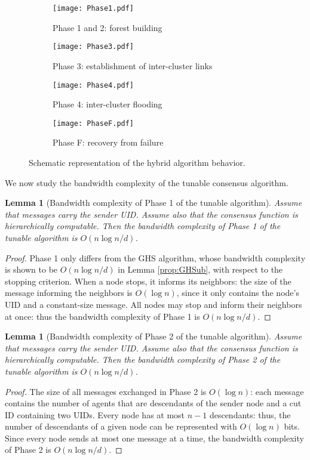 \documentclass[letterpaper,10pt,conference]{ieeeconf}
\newtheorem{lemma}[theorem]{Lemma}
\begin{document}
\begin{figure}[h]
\centering
\begin{subfigure}[b]{0.2\textwidth}
\texttt{[image: Phase1.pdf]}
\caption{Phase 1 and 2: forest building}
\label{fig:hybridalgphase1}
\end{subfigure}
\begin{subfigure}[b]{0.2\textwidth}
\texttt{[image: Phase3.pdf]}
\caption{Phase 3: establishment of inter-cluster links}
\label{fig:hybridalgphase3}
\end{subfigure}

\begin{subfigure}[b]{0.2\textwidth}
\texttt{[image: Phase4.pdf]}
\caption{Phase 4: inter-cluster flooding}
\label{fig:hybridalgphase4}
\end{subfigure}
\begin{subfigure}[b]{0.2\textwidth}
\texttt{[image: PhaseF.pdf]}
\caption{Phase F: recovery from failure}
\label{fig:hybridalgphaseF}
\end{subfigure}
\caption{Schematic representation of the hybrid algorithm behavior.}
\label{fig:hybridalgschematic}
\end{figure}

We now study the bandwidth complexity of the tunable consensus algorithm.

\begin{lemma}[Bandwidth complexity of Phase 1 of the tunable algorithm]
\label{lemma:hybrid1ub}
Assume that messages carry the sender UID. Assume also that the consensus function is hierarchically computable. Then the bandwidth complexity of Phase 1 of the tunable algorithm is $O(n\log n/d)$.
\end{lemma}
\begin{proof}
Phase 1 only differs from the GHS algorithm, whose bandwidth complexity is shown to be $O(n\log n/d)$ in Lemma \ref{prop:GHSub}, with respect to the stopping criterion. When a node stops, it informs its neighbors: the size of the message informing the neighbors is $O(\log n)$, since it only contains the node's UID and a constant-size message. All nodes may stop and inform their neighbors at once: thus the bandwidth complexity of Phase 1 is $O(n\log n /d)$.
\end{proof}

\begin{lemma}[Bandwidth complexity of Phase 2 of the tunable algorithm]
\label{lemma:hybrid2ub}
Assume that messages carry the sender UID. Assume also that the consensus function is hierarchically computable. Then the bandwidth complexity of Phase 2 of the tunable algorithm is $O(n\log n/d)$.
\end{lemma}
\begin{proof}
The size of all messages exchanged in Phase 2 is $O(\log n)$: each message contains the number of agents that are descendants of the sender node and a cut ID containing two UIDs. Every node has at most $n-1$ descendants: thus, the number of descendants of a given node can be represented with $O(\log n)$ bits. Since every node sends at most one message at a time, the bandwidth complexity of Phase 2 is $O(n\log n/d)$.
\end{proof}
\end{document}
